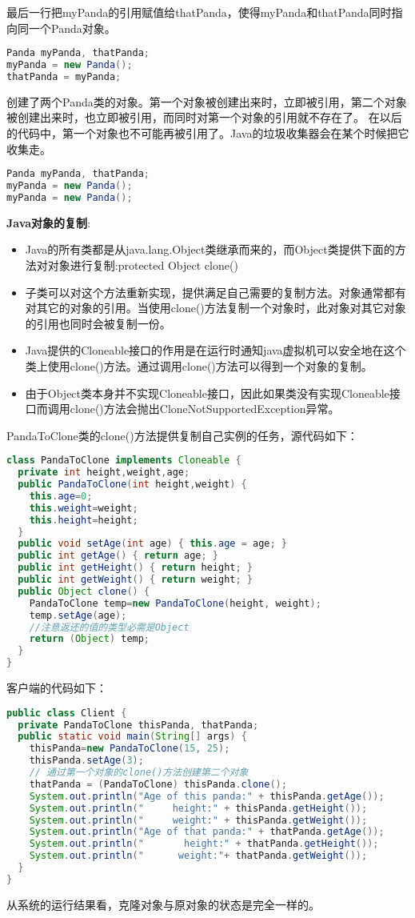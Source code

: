 \documentclass[../main.tex]{subfiles}
\begin{document}
最后一行把myPanda的引用赋值给thatPanda，使得myPanda和thatPanda同时指向同一个Panda对象。
\begin{lstlisting}[language=java]
Panda myPanda, thatPanda;
myPanda = new Panda();
thatPanda = myPanda;
\end{lstlisting}
%
创建了两个Panda类的对象。第一个对象被创建出来时，立即被引用，第二个对象被创建出来时，也立即被引用，而同时对第一个对象的引用就不存在了。
在以后的代码中，第一个对象也不可能再被引用了。Java的垃圾收集器会在某个时候把它收集走。
\begin{lstlisting}[language=java]
Panda myPanda, thatPanda;
myPanda = new Panda();
myPanda = new Panda();
\end{lstlisting}
%
\textbf{Java对象的复制}:
\begin{itemize}
  \item Java的所有类都是从java.lang.Object类继承而来的，而Object类提供下面的方法对对象进行复制:protected Object clone()
  \item 子类可以对这个方法重新实现，提供满足自己需要的复制方法。对象通常都有对其它的对象的引用。当使用clone()方法复制一个对象时，此对象对其它对象的引用也同时会被复制一份。
  \item Java提供的Cloneable接口的作用是在运行时通知java虚拟机可以安全地在这个类上使用clone()方法。通过调用clone()方法可以得到一个对象的复制。
  \item 由于Object类本身并不实现Cloneable接口，因此如果类没有实现Cloneable接口而调用clone()方法会抛出CloneNotSupportedException异常。
\end{itemize}
%
PandaToClone类的clone()方法提供复制自己实例的任务，源代码如下：
\begin{lstlisting}[language=java]
class PandaToClone implements Cloneable {
  private int height,weight,age;
  public PandaToClone(int height,weight) {
    this.age=0;
    this.weight=weight;
    this.height=height;
  }
  public void setAge(int age) { this.age = age; }
  public int getAge() { return age; }
  public int getHeight() { return height; }
  public int getWeight() { return weight; }
  public Object clone() {
    PandaToClone temp=new PandaToClone(height, weight);
    temp.setAge(age);
    //注意返还的值的类型必需是Object
    return (Object) temp;
  }
}
\end{lstlisting}
%
客户端的代码如下：
\begin{lstlisting}[language=java]
public class Client {
  private PandaToClone thisPanda, thatPanda;
  public static void main(String[] args) {
    thisPanda=new PandaToClone(15, 25);
    thisPanda.setAge(3);
    // 通过第一个对象的clone()方法创建第二个对象
    thatPanda = (PandaToClone) thisPanda.clone();
    System.out.println("Age of this panda:" + thisPanda.getAge());
    System.out.println("     height:" + thisPanda.getHeight());
    System.out.println("     weight:" + thisPanda.getWeight());
    System.out.println("Age of that panda:" + thatPanda.getAge());
    System.out.println("       height:" + thatPanda.getHeight());
    System.out.println("      weight:"+ thatPanda.getWeight());
  }
}
\end{lstlisting}
从系统的运行结果看，克隆对象与原对象的状态是完全一样的。
\end{document}
